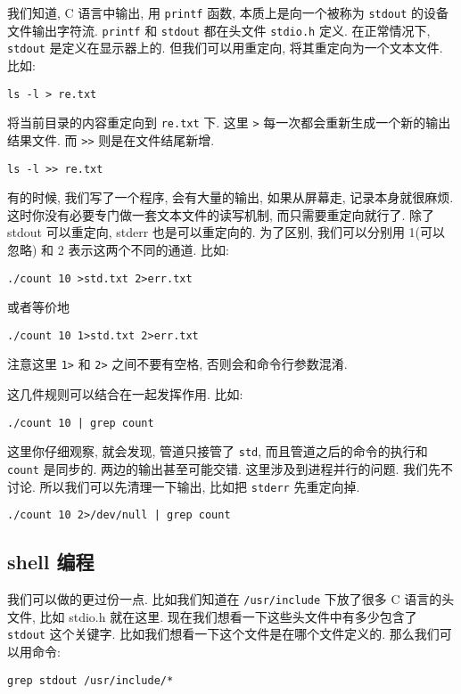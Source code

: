 \documentclass[a4paper]{ctexart}
\begin{document}
我们知道, C 语言中输出, 用 \verb|printf| 函数, 本质上是向一个被称为 \verb|stdout|
的设备文件输出字符流. \verb|printf| 和 \verb|stdout| 都在头文件 \verb|stdio.h| 
定义. 在正常情况下, \verb|stdout| 是定义在显示器上的. 但我们可以用重定向, 将其重定向为一个文本文件.
比如:
\begin{verbatim}
ls -l > re.txt
\end{verbatim}
将当前目录的内容重定向到 \verb|re.txt| 下. 这里 \verb|>| 每一次都会重新生成一个新的输出结果文件.
而 \verb|>>| 则是在文件结尾新增.
\begin{verbatim}
ls -l >> re.txt
\end{verbatim}

有的时候, 我们写了一个程序, 会有大量的输出, 如果从屏幕走, 记录本身就很麻烦.
这时你没有必要专门做一套文本文件的读写机制, 而只需要重定向就行了. 除了 stdout 可以重定向,
stderr 也是可以重定向的. 为了区别, 我们可以分别用 1(可以忽略) 和 2 表示这两个不同的通道. 比如:
\begin{verbatim}
./count 10 >std.txt 2>err.txt
\end{verbatim}
或者等价地
\begin{verbatim}
./count 10 1>std.txt 2>err.txt
\end{verbatim}
注意这里 \verb|1>| 和 \verb|2>| 之间不要有空格, 否则会和命令行参数混淆.

这几件规则可以结合在一起发挥作用. 比如:
\begin{verbatim}
./count 10 | grep count
\end{verbatim}
这里你仔细观察, 就会发现, 管道只接管了 \verb|std|, 而且管道之后的命令的执行和
\verb|count| 是同步的. 两边的输出甚至可能交错. 这里涉及到进程并行的问题. 我们先不讨论.
所以我们可以先清理一下输出, 比如把 \verb|stderr| 先重定向掉. 
\begin{verbatim}
./count 10 2>/dev/null | grep count
\end{verbatim}

\subsection{shell 编程}

我们可以做的更过份一点. 比如我们知道在 \verb|/usr/include| 下放了很多 C 语言的头文件,
比如 stdio.h 就在这里. 现在我们想看一下这些头文件中有多少包含了 \verb|stdout| 这个关键字.
比如我们想看一下这个文件是在哪个文件定义的. 那么我们可以用命令:

\begin{verbatim}
grep stdout /usr/include/*
\end{verbatim}
\end{document}
